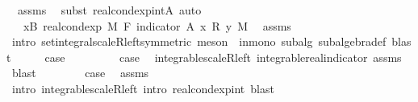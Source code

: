 \begin{isabellebody}
\ {}\ assms\ \isamarkupfalse%
\ {\isacharparenleft}{\kern0pt}subst\ real{\isacharunderscore}{\kern0pt}cond{\isacharunderscore}{\kern0pt}exp{\isacharunderscore}{\kern0pt}intA{\isacharcomma}{\kern0pt}\ auto{\isacharparenright}{\kern0pt}\isanewline
\ \ \isamarkupfalse%
\ \isamarkupfalse%
\ {\isachardoublequoteopen}{\isachardot}{\kern0pt}{\isachardot}{\kern0pt}{\isachardot}{\kern0pt}\ {\isacharequal}{\kern0pt}\ {\isasymintegral}x{\isasymin}B{\isachardot}{\kern0pt}\ {\isacharparenleft}{\kern0pt}real{\isacharunderscore}{\kern0pt}cond{\isacharunderscore}{\kern0pt}exp\ M\ F\ {\isacharparenleft}{\kern0pt}indicator\ A{\isacharparenright}{\kern0pt}\ x\ {\isacharasterisk}{\kern0pt}\isactrlsub R\ y{\isacharparenright}{\kern0pt}\ {\isasympartial}M{\isachardoublequoteclose}\ \isamarkupfalse%
\ assms\ \isamarkupfalse%
\ {\isacharparenleft}{\kern0pt}intro\ set{\isacharunderscore}{\kern0pt}integral{\isacharunderscore}{\kern0pt}scaleR{\isacharunderscore}{\kern0pt}left{\isacharbrackleft}{\kern0pt}symmetric{\isacharbrackright}{\kern0pt}{\isacharcomma}{\kern0pt}\ meson\ {}\ in{\isacharunderscore}{\kern0pt}mono\ subalg\ subalgebra{\isacharunderscore}{\kern0pt}def{\isacharcomma}{\kern0pt}\ blast{\isacharparenright}{\kern0pt}\isanewline
\ \ \isamarkupfalse%
\ \isamarkupfalse%
\ {\isacharquery}{\kern0pt}case\ \isacommand{{\isachardot}{\kern0pt}}\isamarkupfalse%
\isanewline
{}\isamarkupfalse%
\isanewline
\ \ \isamarkupfalse%
\ {}\isanewline
\ \ \isamarkupfalse%
\ {\isacharquery}{\kern0pt}case\ \isamarkupfalse%
\ integrable{\isacharunderscore}{\kern0pt}scaleR{\isacharunderscore}{\kern0pt}left\ integrable{\isacharunderscore}{\kern0pt}real{\isacharunderscore}{\kern0pt}indicator\ assms\ \isamarkupfalse%
\ blast\isanewline
{}\isamarkupfalse%
\isanewline
\ \ \isamarkupfalse%
\ {}\isanewline
\ \ \isamarkupfalse%
\ {\isacharquery}{\kern0pt}case\ \isamarkupfalse%
\ assms\ \isamarkupfalse%
\ {\isacharparenleft}{\kern0pt}intro\ integrable{\isacharunderscore}{\kern0pt}scaleR{\isacharunderscore}{\kern0pt}left{\isacharcomma}{\kern0pt}\ intro\ real{\isacharunderscore}{\kern0pt}cond{\isacharunderscore}{\kern0pt}exp{\isacharunderscore}{\kern0pt}int{\isacharcomma}{\kern0pt}\ blast{\isacharplus}{\kern0pt}{\isacharparenright}{\kern0pt}\isanewline
{}\isamarkupfalse%

\end{isabellebody}
